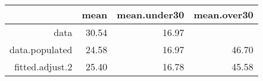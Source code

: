 \begin{table}[ht]
\centering
\begin{tabular}{rrrr}
  \hline
 & mean & mean.under30 & mean.over30 \\ 
  \hline
data & 30.54 & 16.97 &  \\ 
  data.populated & 24.58 & 16.97 & 46.70 \\ 
  fitted.adjust.2 & 25.40 & 16.78 & 45.58 \\ 
   \hline
\end{tabular}
\end{table}
